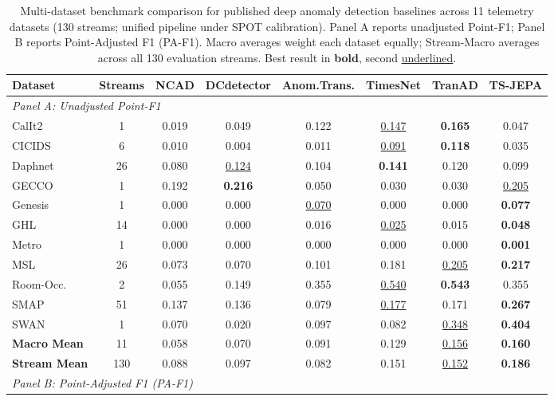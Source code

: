 \begin{table}[t]
\centering
\scriptsize
\caption{Multi-dataset benchmark comparison for published deep anomaly detection baselines across 11 telemetry datasets (130 streams; unified pipeline under SPOT calibration). Panel A reports unadjusted Point-F1; Panel B reports Point-Adjusted F1 (PA-F1). Macro averages weight each dataset equally; Stream-Macro averages across all 130 evaluation streams. Best result in \textbf{bold}, second \underline{underlined}.}\label{tab:sota_baselines}
\scriptsize
\setlength{\tabcolsep}{2.5pt}
\begin{tabular}{@{}lccccccc@{}}
\toprule
Dataset & Streams & NCAD & DCdetector & Anom.Trans. & TimesNet & TranAD & TS-JEPA \\
\midrule
\multicolumn{8}{l}{\textit{Panel A: Unadjusted Point-F1}} \\
CalIt2       &  1 & 0.019 & 0.049 & 0.122 & \underline{0.147} & \textbf{0.165} & 0.047 \\
CICIDS       &  6 & 0.010 & 0.004 & 0.011 & \underline{0.091} & \textbf{0.118} & 0.035 \\
Daphnet      & 26 & 0.080 & \underline{0.124} & 0.104 & \textbf{0.141} & 0.120 & 0.099 \\
GECCO        &  1 & 0.192 & \textbf{0.216} & 0.050 & 0.030 & 0.030 & \underline{0.205} \\
Genesis      &  1 & 0.000 & 0.000 & \underline{0.070} & 0.000 & 0.000 & \textbf{0.077} \\
GHL          & 14 & 0.000 & 0.000 & 0.016 & \underline{0.025} & 0.015 & \textbf{0.048} \\
Metro        &  1 & 0.000 & 0.000 & 0.000 & 0.000 & 0.000 & \textbf{0.001} \\
MSL          & 26 & 0.073 & 0.070 & 0.101 & 0.181 & \underline{0.205} & \textbf{0.217} \\
Room-Occ.    &  2 & 0.055 & 0.149 & 0.355 & \underline{0.540} & \textbf{0.543} & 0.355 \\
SMAP         & 51 & 0.137 & 0.136 & 0.079 & \underline{0.177} & 0.171 & \textbf{0.267} \\
SWAN         &  1 & 0.070 & 0.020 & 0.097 & 0.082 & \underline{0.348} & \textbf{0.404} \\
\midrule
\textbf{Macro Mean}  & 11  & 0.058 & 0.070 & 0.091 & 0.129 & \underline{0.156} & \textbf{0.160} \\
\textbf{Stream Mean} & 130 & 0.088 & 0.097 & 0.082 & 0.151 & \underline{0.152} & \textbf{0.186} \\
\midrule
\multicolumn{8}{l}{\textit{Panel B: Point-Adjusted F1 (PA-F1)}} \\

\end{tabular}
\end{table}
